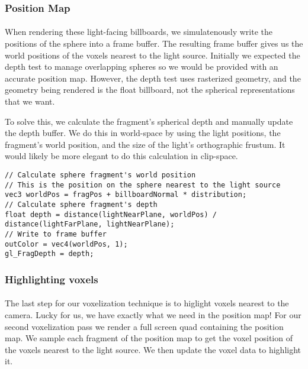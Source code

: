
\subsubsection{Position Map}\paragraph{}
When rendering these light-facing billboards, we simulatenously write the positions of the sphere into a frame buffer. 
The resulting frame buffer gives us the world positions of the voxels nearest to the light source. 
Initially we expected the depth test to manage overlapping spheres so we would be provided with an accurate position map. 
However, the depth test uses rasterized geometry, and the geometry being rendered is the float billboard, not the spherical representations that we want. 

To solve this, we calculate the fragment's spherical depth and manually update the depth buffer. We do this in world-space by using the light positions, the fragment's world position, and the size of the light's orthographic frustum. It would likely be more elegant to do this calculation in clip-space.
\begin{lstlisting}[caption={first\_voxelize.glsl, 60}]
// Calculate sphere fragment's world position 
// This is the position on the sphere nearest to the light source
vec3 worldPos = fragPos + billboardNormal * distribution;
// Calculate sphere fragment's depth
float depth = distance(lightNearPlane, worldPos) / distance(lightFarPlane, lightNearPlane);
// Write to frame buffer
outColor = vec4(worldPos, 1);
gl_FragDepth = depth;
\end{lstlisting}


\subsubsection{Highlighting voxels}\paragraph{}
The last step for our voxelization technique is to higlight voxels nearest to the camera. Lucky for us, we have exactly what we need in the position map! 
For our second voxelization pass we render a full screen quad containing the position map. We sample each fragment of the position map to get the voxel position of the voxels nearest to the light source. We then update the voxel data to highlight it. 


